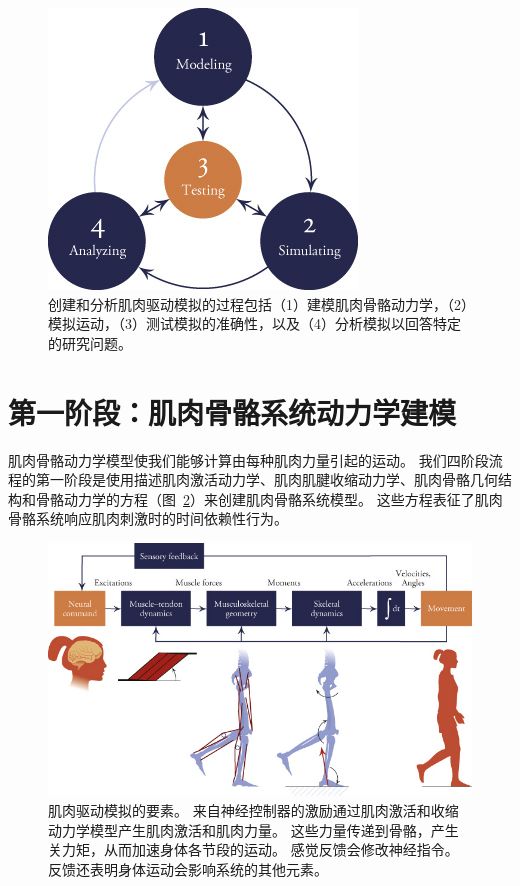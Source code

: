 \begin{figure}[!htb]
	\centering
	\includegraphics[width=0.5\linewidth]{chap10/10_3}
	\caption{创建和分析肌肉驱动模拟的过程包括（1）建模肌肉骨骼动力学，（2）模拟运动，（3）测试模拟的准确性，以及（4）分析模拟以回答特定的研究问题。 \label{fig:10_3}}
\end{figure}


\section{第一阶段：肌肉骨骼系统动力学建模}

肌肉骨骼动力学模型使我们能够计算由每种肌肉力量引起的运动。
我们四阶段流程的第一阶段是使用描述肌肉激活动力学、肌肉肌腱收缩动力学、肌肉骨骼几何结构和骨骼动力学的方程（图~\ref{fig:10_4}）来创建肌肉骨骼系统模型。
这些方程表征了肌肉骨骼系统响应肌肉刺激时的时间依赖性行为。


\begin{figure}[!htb]
	\centering
	\includegraphics[width=1.0\linewidth]{chap10/10_4}
	\caption{肌肉驱动模拟的要素。
		来自神经控制器的激励通过肌肉激活和收缩动力学模型产生肌肉激活和肌肉力量。
		这些力量传递到骨骼，产生关力矩，从而加速身体各节段的运动。
		感觉反馈会修改神经指令。
		反馈还表明身体运动会影响系统的其他元素。 \label{fig:10_4}}
\end{figure}


